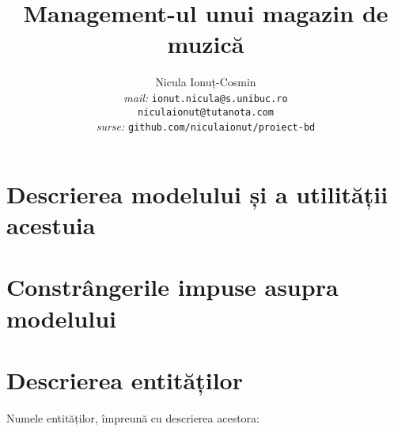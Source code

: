 \documentclass[a4paper, oneside, 12pt]{article}
\title{Management-ul unui magazin de muzică}
\author{Nicula Ionuț-Cosmin \\ \emph{mail: }\texttt{ionut.nicula@s.unibuc.ro} \\\hspace{35pt}\texttt{niculaionut@tutanota.com}
\\ \emph{surse: }\texttt{github.com/niculaionut/proiect-bd}}
\begin{document}
\maketitle

\newpage

\tableofcontents

\newpage

\section{Descrierea modelului și a utilității acestuia}

\section{Constrângerile impuse asupra modelului}

\section{Descrierea entităților}

Numele entităților, împreună cu descrierea acestora:
\end{document}
